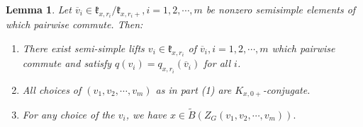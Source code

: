 \documentclass[12pt]{article}
\newtheorem{lemma}[theorem]{Lemma}
\theoremstyle{remark}
\begin{document}
\begin{lemma}\label{inverseconstruction2}
Let $\overline{v}_i\in\mathfrak{k}_{x,r_i}/\mathfrak{k}_{x,r_i+}, i=1,2,\cdots, m$ be nonzero semisimple elements of which pairwise commute. Then:
\begin{enumerate}
\item There exist semi-simple lifts $v_i\in\mathfrak{k}_{x,r_i}$ of $\overline{v}_i, i=1,2,\cdots, m$ which pairwise commute and satisfy $q(v_i)=q_{x,r_i}(\overline{v}_i)$ for all $i$.
\item All choices of $(v_1,v_2,\cdots, v_m)$ as in part (1) are $K_{x,0+}$-conjugate.
\item For any choice of the $v_i$, we have $x\in\widetilde{B}(Z_G(v_1,v_2,\cdots, v_m)).$
 \end{enumerate}
\end{lemma}
\end{document}
